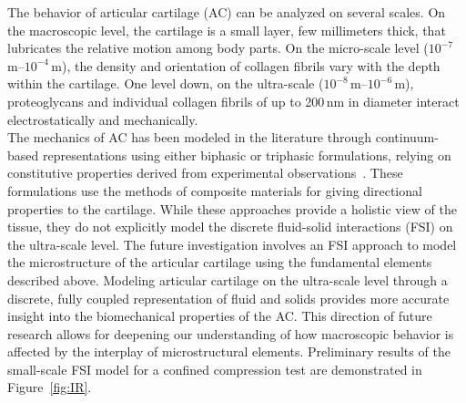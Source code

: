 The behavior of articular cartilage (AC) can be analyzed on several scales. On the macroscopic level, the cartilage is a small layer, few millimeters thick, that lubricates the relative motion among body parts. On the micro-scale level ($10^{-7}$\,m--$10^{-4}$\,m), the density and orientation of collagen fibrils vary with the depth within the cartilage. One level down, on the ultra-scale ($10^{-8}$\,m--$10^{-6}$\,m), proteoglycans and individual collagen fibrils of up to 200\,nm in diameter interact electrostatically and mechanically.\\ The mechanics of AC has been modeled in the literature through continuum-based representations using either biphasic or triphasic formulations, relying on constitutive properties derived from experimental observations~\cite{Li2009,halloran2012multiscale}. These formulations use the methods of composite materials for giving directional properties to the cartilage. While these approaches provide a holistic view of the tissue, they do not explicitly model the discrete fluid-solid interactions (FSI) on the ultra-scale level. The future investigation involves an FSI approach to model the microstructure of the articular cartilage using the fundamental elements described above. Modeling articular cartilage on the ultra-scale level through a discrete, fully coupled representation of fluid and solids provides more accurate insight into the biomechanical properties of the AC. This direction of future research allows for deepening our understanding of how macroscopic behavior is affected by the interplay of microstructural elements. 
Preliminary results of the small-scale FSI model for a confined compression test are demonstrated in Figure~\ref{fig:IR}.
